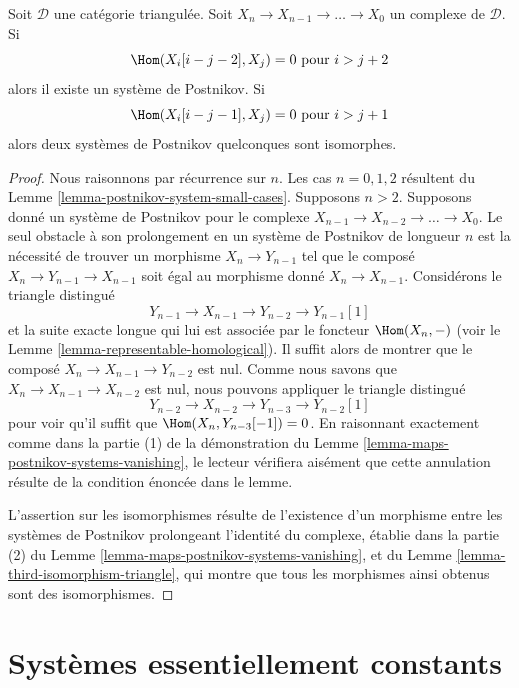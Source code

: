 \begin{lemma}
\label{lemma-existence-postnikov-system}
Soit $\mathcal{D}$ une catégorie triangulée.
Soit $X_n \to X_{n - 1} \to \ldots \to X_0$ un complexe de
$\mathcal{D}$. Si
$$
\Hom(X_i[i - j - 2], X_j) = 0 \text{ pour }i > j + 2
$$
alors il existe un système de Postnikov. Si
$$
\Hom(X_i[i - j - 1], X_j) = 0 \text{ pour }i > j + 1
$$
alors deux systèmes de Postnikov quelconques sont isomorphes.
\end{lemma}

\begin{proof}
Nous raisonnons par récurrence sur $n$. Les cas $n = 0, 1, 2$ résultent du
Lemme \ref{lemma-postnikov-system-small-cases}.
Supposons $n > 2$.
Supposons donné un système de Postnikov pour le complexe
$X_{n - 1} \to X_{n - 2} \to \ldots \to X_0$.
Le seul obstacle à son prolongement en un système de Postnikov de longueur
$n$ est la nécessité de trouver un morphisme $X_n \to Y_{n - 1}$ tel que le
composé $X_n \to Y_{n - 1} \to X_{n - 1}$ soit égal au morphisme donné
$X_n \to X_{n - 1}$. Considérons le triangle distingué
$$
Y_{n - 1} \to X_{n - 1} \to Y_{n - 2} \to Y_{n - 1}[1]
$$
et la suite exacte longue qui lui est associée par le foncteur
$\Hom(X_n, -)$ (voir le Lemme \ref{lemma-representable-homological}).
Il suffit alors de montrer que le composé
$X_n \to X_{n - 1} \to Y_{n - 2}$ est nul.
Comme nous savons que $X_n \to X_{n - 1} \to X_{n - 2}$ est nul, nous
pouvons appliquer le triangle distingué
$$
Y_{n - 2} \to X_{n - 2} \to Y_{n - 3} \to Y_{n - 2}[1]
$$
pour voir qu'il suffit que $\Hom(X_n, Y_{n - 3}[-1]) = 0$.
En raisonnant exactement comme dans la partie (1) de la démonstration du
Lemme \ref{lemma-maps-postnikov-systems-vanishing}, le lecteur vérifiera
aisément que cette annulation résulte de la condition énoncée dans le lemme.

\medskip\noindent
L'assertion sur les isomorphismes résulte de l'existence d'un morphisme entre
les systèmes de Postnikov prolongeant l'identité du complexe, établie dans la
partie (2) du Lemme \ref{lemma-maps-postnikov-systems-vanishing}, et du
Lemme \ref{lemma-third-isomorphism-triangle}, qui montre que tous les
morphismes ainsi obtenus sont des isomorphismes.
\end{proof}

\section{Systèmes essentiellement constants}
\label{section-essentially-constant}

